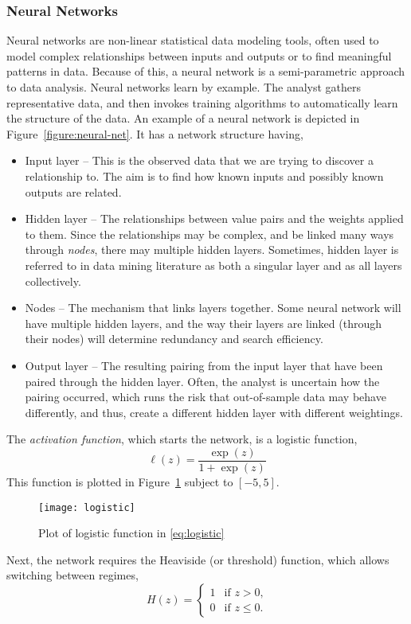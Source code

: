 \subsubsection{Neural Networks}
Neural networks are non-linear statistical data modeling tools, often used to model complex relationships between inputs and outputs or to find meaningful patterns in data. Because of this, a neural network is a semi-parametric approach to data analysis. Neural networks learn by example. The analyst gathers representative data, and then invokes training algorithms to automatically learn the structure of the data. An example of a neural network is depicted in Figure~\ref{figure:neural-net}. It has a network structure having,
\begin{itemize}
\item Input layer -- This is the observed data that we are trying to discover a relationship to. The aim is to find how known inputs and possibly known outputs are related.
\item Hidden layer -- The relationships between value pairs and the weights applied to them. Since the relationships may be complex, and be linked many ways through \emph{nodes}, there may multiple hidden layers. Sometimes, hidden layer is referred to in data mining literature as both a singular layer and as all layers collectively.
\item Nodes -- The mechanism that links layers together. Some neural network will have multiple hidden layers, and the way their layers are linked (through their nodes) will determine redundancy and search efficiency.
\item Output layer -- The resulting pairing from the input layer that have been paired through the hidden layer. Often, the analyst is uncertain how the pairing occurred, which runs the risk that out-of-sample data may behave differently, and thus, create a different hidden layer with different weightings.
\end{itemize}
The \emph{activation function}, which starts the network, is a logistic function,
\begin{equation}
\ell(z) = \frac{\exp(z)}{1+\exp(z)}
\label{eq:logistic}
\end{equation}
This function is plotted in Figure~\ref{figure:logistic} subject to $[-5,5]$.
\begin{figure}[tb]
	\centering
	\texttt{[image: logistic]}
	\caption{Plot of logistic function in \eqref{eq:logistic}}
	\label{figure:logistic}
\end{figure}
Next, the network requires the Heaviside (or threshold) function, which allows switching between regimes,
\[
H(z)=
\begin{cases}
1 &\text{if $z>0$,} \\
0 &\text{if $z \le 0$.}
\end{cases}
\]

